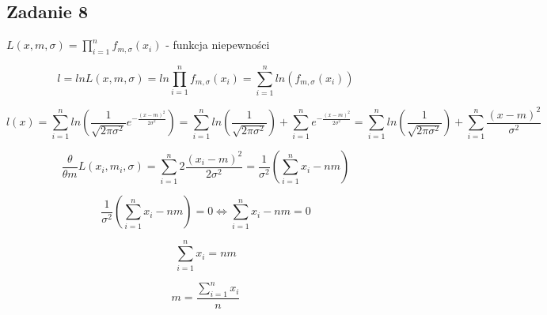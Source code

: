 \subsection{Zadanie 8}

$L(x,m,\sigma)=\displaystyle\prod\limits_{i=1}^n f_{m,\sigma} (x_i)$ - funkcja niepewności

$$l=ln L(x,m,\sigma)=ln \displaystyle\prod\limits_{i=1}^n f_{m,\sigma} (x_i)=\displaystyle\sum\limits_{i=1}^n ln(f_{m,\sigma} (x_i))$$

$$l(x)=\displaystyle\sum\limits_{i=1}^n ln(\frac{1}{\sqrt{2\pi\sigma^2}}e^{-\frac{(x-m)^2}{2\sigma^2}})=\displaystyle\sum\limits_{i=1}^n ln (\frac{1}{\sqrt{2\pi\sigma^2}})+\displaystyle\sum\limits_{i=1}^n e^{-\frac{(x-m)^2}{2\sigma^2}}=\displaystyle\sum\limits_{i=1}^n ln (\frac{1}{\sqrt{2\pi\sigma^2}})+\displaystyle\sum\limits_{i=1}^n {\frac{(x-m)^2}{\sigma^2}}$$

$${\frac{\theta}{\theta m}}L(x_i,m_i,\sigma)=\displaystyle\sum\limits_{i=1}^n 2{\frac{(x_i-m)^2}{2\sigma^2}}={\frac{1}{\sigma^2}}(\displaystyle\sum\limits_{i=1}^n x_i-nm)$$

$${\frac{1}{\sigma^2}}(\displaystyle\sum\limits_{i=1}^n x_i-nm)=0 \Leftrightarrow\displaystyle\sum\limits_{i=1}^n x_i-nm=0$$

$$\displaystyle\sum\limits_{i=1}^n x_i=nm$$

$$m={\frac{\displaystyle\sum\limits_{i=1}^n x_i}{n}}$$
